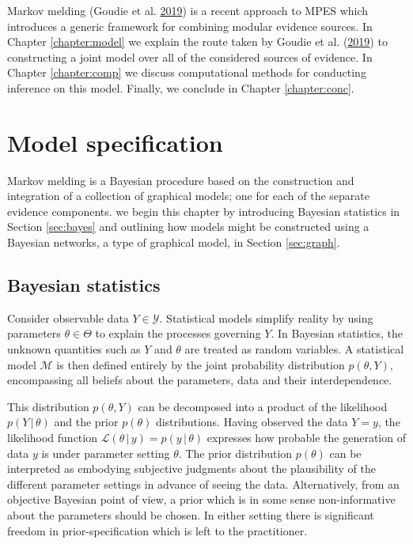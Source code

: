 \documentclass[11pt,]{book}
\begin{document}
Markov melding (Goudie et al.
\protect\hyperlink{ref-goudie2019joining}{2019}) is a recent approach to
MPES which introduces a generic framework for combining modular evidence
sources. In Chapter \ref{chapter:model} we explain the route taken by
Goudie et al. (\protect\hyperlink{ref-goudie2019joining}{2019}) to
constructing a joint model over all of the considered sources of
evidence. In Chapter \ref{chapter:comp} we discuss computational methods
for conducting inference on this model. Finally, we conclude in Chapter
\ref{chapter:conc}.

\chapter{\texorpdfstring{Model specification
\label{chapter:model}}{Model specification }}\label{model-specification}

Markov melding is a Bayesian procedure based on the construction and
integration of a collection of graphical models; one for each of the
separate evidence components. we begin this chapter by introducing
Bayesian statistics in Section \ref{sec:bayes} and outlining how models
might be constructed using a Bayesian networks, a type of graphical
model, in Section \ref{sec:graph}.

\section{\texorpdfstring{Bayesian statistics
\label{sec:bayes}}{Bayesian statistics }}\label{bayesian-statistics}

Consider observable data \(Y \in \mathcal{Y}\). Statistical models
simplify reality by using parameters \(\theta \in \Theta\) to explain
the processes governing \(Y\). In Bayesian statistics, the unknown
quantities such as \(Y\) and \(\theta\) are treated as random variables.
A statistical model \(\mathcal{M}\) is then defined entirely by the
joint probability distribution \(p(\theta, Y)\), encompassing all
beliefs about the parameters, data and their interdependence.

This distribution \(p(\theta, Y)\) can be decomposed into a product of
the likelihood \(p(Y \, | \, \theta)\) and the prior \(p(\theta)\)
distributions. Having observed the data \(Y = y\), the likelihood
function \(\mathcal{L}(\theta \, | \, y) = p(y \, | \, \theta)\)
expresses how probable the generation of data \(y\) is under parameter
setting \(\theta\). The prior distribution \(p(\theta)\) can be
interpreted as embodying subjective judgments about the plausibility of
the different parameter settings in advance of seeing the data.
Alternatively, from an objective Bayesian point of view, a prior which
is in some sense non-informative about the parameters should be chosen.
In either setting there is significant freedom in prior-specification
which is left to the practitioner.
\end{document}
